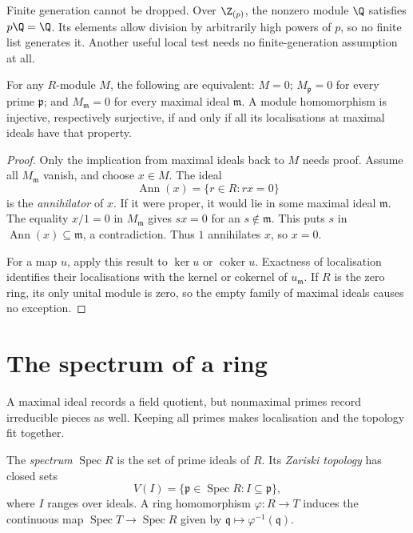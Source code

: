 Finite generation cannot be dropped. Over $\Z_{(p)}$, the nonzero module $\Q$ satisfies $p\Q=\Q$. Its elements allow division by arbitrarily high powers of $p$, so no finite list generates it. Another useful local test needs no finite-generation assumption at all.

\begin{proposition}\label{prop:localzero}
For any $R$-module $M$, the following are equivalent: $M=0$; $M_{\mathfrak p}=0$ for every prime $\mathfrak p$; and $M_{\mathfrak m}=0$ for every maximal ideal $\mathfrak m$. A module homomorphism is injective, respectively surjective, if and only if all its localisations at maximal ideals have that property.
\end{proposition}

\begin{proof}
Only the implication from maximal ideals back to $M$ needs proof. Assume all $M_{\mathfrak m}$ vanish, and choose $x\in M$. The ideal
\[
\operatorname{Ann}(x)=\{r\in R:rx=0\}
\]
is the \emph{annihilator} of $x$. If it were proper, it would lie in some maximal ideal $\mathfrak m$. The equality $x/1=0$ in $M_{\mathfrak m}$ gives $sx=0$ for an $s\notin\mathfrak m$. This puts $s$ in $\operatorname{Ann}(x)\subseteq\mathfrak m$, a contradiction. Thus $1$ annihilates $x$, so $x=0$.

For a map $u$, apply this result to $\ker u$ or $\operatorname{coker}u$. Exactness of localisation identifies their localisations with the kernel or cokernel of $u_{\mathfrak m}$. If $R$ is the zero ring, its only unital module is zero, so the empty family of maximal ideals causes no exception.
\end{proof}

\section{The spectrum of a ring}

A maximal ideal records a field quotient, but nonmaximal primes record irreducible pieces as well. Keeping all primes makes localisation and the topology fit together.

\begin{definition}\label{def:spec}
The \emph{spectrum} $\operatorname{Spec}R$ is the set of prime ideals of $R$. Its \emph{Zariski topology} has closed sets
\[
 V(I)=\{\mathfrak p\in\operatorname{Spec}R:I\subseteq\mathfrak p\},
\]
where $I$ ranges over ideals. A ring homomorphism $\varphi\colon R\to T$ induces the continuous map $\operatorname{Spec}T\to\operatorname{Spec}R$ given by $\mathfrak q\mapsto\varphi^{-1}(\mathfrak q)$.
\end{definition}


